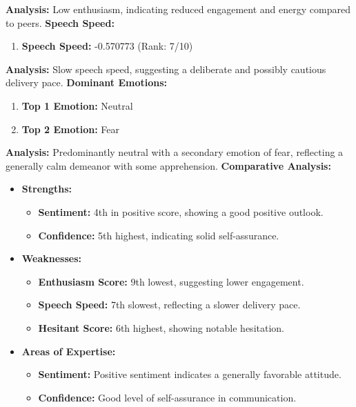 \documentclass{article}
\begin{document}
    \textbf{Analysis:} Low enthusiasm, indicating reduced engagement and energy compared to peers.
    \vspace{0.1in}
\large{\textbf{Speech Speed:}}
\begin{tcolorbox}[title=Speech Speed]
    \begin{enumerate}
        \item \textbf{Speech Speed:} \textcolor{purple!70!black}{-0.570773} (Rank: 7/10)
    \end{enumerate}
\end{tcolorbox}
    \textbf{Analysis:} Slow speech speed, suggesting a deliberate and possibly cautious delivery pace.
    \vspace{0.1in}
\large{\textbf{Dominant Emotions:}}
\begin{tcolorbox}[colback=red!5!white,colframe=red!75!black,title=Emotional State]
    \begin{enumerate}
        \item \textbf{Top 1 Emotion:} \textcolor{blue!80!black}{Neutral}
        \item \textbf{Top 2 Emotion:} \textcolor{red!80!black}{Fear}
    \end{enumerate}
\end{tcolorbox}
    \textbf{Analysis:} Predominantly neutral with a secondary emotion of fear, reflecting a generally calm demeanor with some apprehension.
    \vspace{0.2in}
\textbf{Comparative Analysis:}
\begin{itemize}
    \item \textbf{Strengths:}
    \begin{itemize}
        \item \textbf{Sentiment:} 4th in positive score, showing a good positive outlook.
        \item \textbf{Confidence:} 5th highest, indicating solid self-assurance.
    \end{itemize}
    \item \textbf{Weaknesses:}
    \begin{itemize}
        \item \textbf{Enthusiasm Score:} 9th lowest, suggesting lower engagement.
        \item \textbf{Speech Speed:} 7th slowest, reflecting a slower delivery pace.
        \item \textbf{Hesitant Score:} 6th highest, showing notable hesitation.
    \end{itemize}
    \item \textbf{Areas of Expertise:}
    \begin{itemize}
        \item \textbf{Sentiment:} Positive sentiment indicates a generally favorable attitude.
        \item \textbf{Confidence:} Good level of self-assurance in communication.
    \end{itemize}
\end{itemize}
\end{document}
